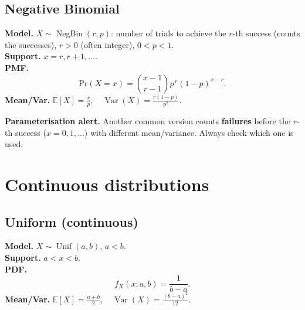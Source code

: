 \documentclass[
  letterpaper,
  DIV=11,
  numbers=noendperiod]{scrreprt}
\theoremstyle{definition}
\theoremstyle{plain}
\theoremstyle{definition}
\theoremstyle{remark}
\begin{document}
\subsection*{Negative Binomial}\label{sec-negbin}

\textbf{Model.} \(X \sim \operatorname{NegBin}(r,p)\): number of trials
to achieve the \(r\)-th success (counts the successes), \(r>0\) (often
integer), \(0<p<1\).\\
\textbf{Support.} \(x=r,r+1,\ldots\).\\
\textbf{PMF.} \[
\mathrm{Pr}(X=x) = \binom{x-1}{r-1} p^{\,r} (1-p)^{x-r}.
\] \textbf{Mean/Var.}
\(\mathbb{E}[X]=\frac{r}{p},\quad \operatorname{Var}(X)=\frac{r(1-p)}{p^2}.\)

\begin{tcolorbox}[enhanced jigsaw, left=2mm, toprule=.15mm, breakable, opacityback=0, titlerule=0mm, toptitle=1mm, colbacktitle=quarto-callout-warning-color!10!white, colframe=quarto-callout-warning-color-frame, coltitle=black, rightrule=.15mm, leftrule=.75mm, bottomrule=.15mm, arc=.35mm, bottomtitle=1mm, title=\textcolor{quarto-callout-warning-color}{\faExclamationTriangle}\hspace{0.5em}{Warning}, colback=white, opacitybacktitle=0.6]

\textbf{Parameterisation alert.} Another common version counts
\textbf{failures} before the \(r\)-th success (\(x=0,1,\dots\)) with
different mean/variance. Always check which one is used.

\end{tcolorbox}

\section*{Continuous distributions}\label{continuous-distributions}


\subsection*{Uniform (continuous)}\label{sec-unif}

\textbf{Model.} \(X \sim \operatorname{Unif}(a,b)\), \(a<b\).\\
\textbf{Support.} \(a<x<b\).\\
\textbf{PDF.} \[
f_X(x;a,b)=\frac{1}{b-a}.
\] \textbf{Mean/Var.}
\(\mathbb{E}[X]=\frac{a+b}{2},\quad \operatorname{Var}(X)=\frac{(b-a)^2}{12}.\)
\end{document}
